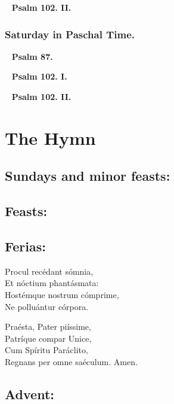 \documentclass[a5paper,12pt,twoside,openany]{memoir}
\let\oldtextbf\textbf
\newcommand\psalm[1]{~ \hfill \oldtextbf{Psalm #1.} \hfill ~}
\begin{document}
\psalm{102. II}


\subsection{Saturday in Paschal Time.}


\psalm{87}

\psalm{102. I}

\psalm{102. II}






\chapter{The Hymn}

\section{Sundays and minor feasts:}


\section{Feasts:}


\section{Ferias:}


Procul recédant sómnia,\\
Et nóctium phantásmata:\\
Hostémque nostrum cómprime,\\
Ne polluántur córpora.

Praésta, Pater piíssime,\\
Patríque compar Unice,\\
Cum Spíritu Paráclito,\\
Regnans per omne saéculum.  Amen.

\section{Advent:}
\end{document}
